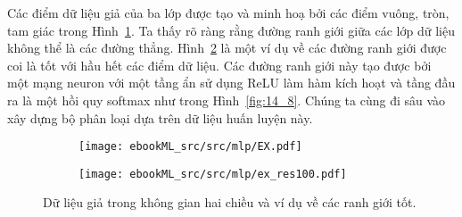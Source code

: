 
Các điểm dữ liệu giả của ba lớp được tạo và minh hoạ bởi các điểm vuông, tròn,
tam giác trong Hình~\ref{fig:14_7a}. Ta thấy rõ ràng rằng đường ranh giới giữa
các lớp dữ liệu không thể là các đường thẳng. Hình~\ref{fig:14_7b} là một ví dụ
về các đường ranh giới được coi là tốt với hầu hết các điểm dữ liệu. Các đường
ranh giới này tạo được bởi một mạng neuron với một tầng ẩn sử dụng ReLU làm hàm
kích hoạt và tầng đầu ra là một hồi quy softmax như trong Hình~\ref{fig:14_8}.
Chúng ta cùng đi sâu vào xây dựng bộ phân loại dựa trên dữ liệu huấn luyện này.%

 \begin{figure}[t]
     \begin{subfigure}{0.45\textwidth}
     \texttt{[image: ebookML\_src/src/mlp/EX.pdf]}
     \caption{}
     \label{fig:14_7a}
     \end{subfigure}
     \begin{subfigure}{0.45\textwidth}
     \texttt{[image: ebookML\_src/src/mlp/ex\_res100.pdf]}
     \caption{}
     \label{fig:14_7b}
     \end{subfigure}
     \caption{
     Dữ liệu giả trong không gian hai chiều và ví dụ về các ranh giới tốt.  
     }
     \label{fig:14_7}
 \end{figure}
  

